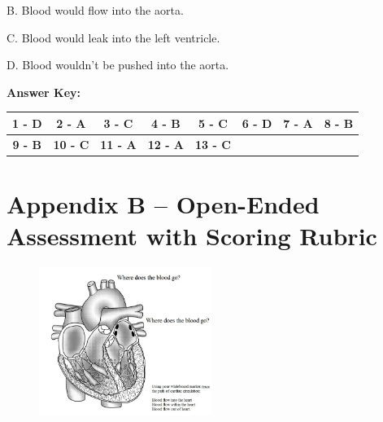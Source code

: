 \documentclass[11.5pt]{sig-alternate} %
\begin{document}
B. Blood would flow into the aorta.

C. Blood would leak into the left ventricle.

D. Blood wouldn’t be pushed into the aorta.

\textbf{Answer Key:}
\begin{table}[!hbp]
\begin{tabular}{|c|c|c|c|c|c|c|c|}
\hline
\textbf{1 - D} & \textbf{2 - A} & \textbf{3 - C} & \textbf{4 - B} & \textbf{5 - C} & \textbf{6 - D} & \textbf{7 - A} & \textbf{8 - B} \\ \hline
\textbf{9 - B} & \textbf{10 - C} & \textbf{11 - A} & \textbf{12 - A} & \textbf{13 - C} & & & \\ \hline
\end{tabular}
\end{table}

\section*{Appendix B – Open-Ended Assessment with Scoring Rubric}
 \begin{figure}[!h]
    \centering
    \includegraphics[width=0.5\textwidth]{Appendix B-heart.png}
\end{figure}
\end{document}
